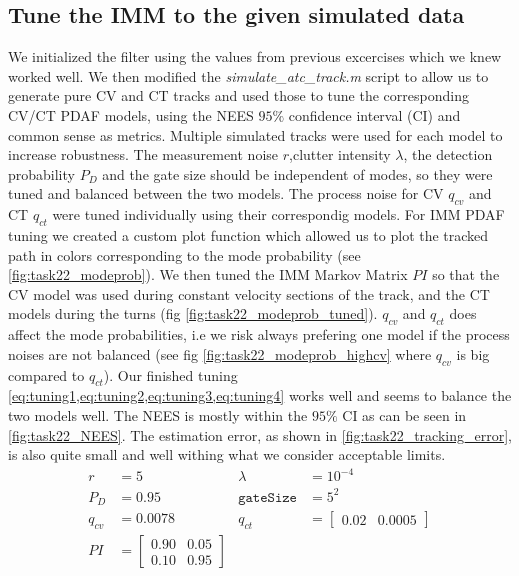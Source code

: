 \subsection{Tune the IMM to the given simulated data}

We initialized the filter using the values from previous excercises which we knew worked well. We then modified the \textit{simulate\_atc\_track.m} script to allow us to generate pure CV and CT tracks and used those to tune the corresponding CV/CT PDAF models, using the NEES $95 \%$ confidence interval (CI) and common sense as metrics. Multiple simulated tracks were used for each model to increase robustness. The measurement noise $r$,clutter intensity $\lambda$, the detection probability $P_D$ and the gate size should be independent of modes, so they were tuned and balanced between the two models. The process noise for CV $q_{cv}$ and CT $q_{ct}$ were tuned individually using their correspondig models. For IMM PDAF tuning we created a custom plot function which allowed us to plot the tracked path in colors corresponding to the mode probability (see \cref{fig:task22_modeprob}). We then tuned the IMM Markov Matrix $PI$ so that the CV model was used during constant velocity sections of the track, and the CT models during the turns (fig \ref{fig:task22_modeprob_tuned}). $q_{cv}$ and $q_{ct}$ does affect the mode probabilities, i.e we risk always prefering one model if the process noises are not balanced (see fig \ref{fig:task22_modeprob_highcv} where $q_{cv}$ is big compared to $q_{ct}$). Our finished tuning \cref{eq:tuning1,eq:tuning2,eq:tuning3,eq:tuning4} works well and seems to balance the two models well. The NEES is mostly within the $95\%$ CI as can be seen in \cref{fig:task22_NEES}. The estimation error, as shown in \cref{fig:task22_tracking_error}, is also quite small and well withing what we consider acceptable limits.
\begin{align}
        r &= 5 & \lambda &= 10^{-4} \label{eq:tuning1} \\ 
        P_D &= 0.95 & \texttt{gateSize} &= 5^2 \label{eq:tuning2} \\
        q_{cv} &= 0.0078  & q_{ct} &= \begin{bmatrix}0.02 & 0.0005\end{bmatrix} \label{eq:tuning3} \\
        PI &= \begin{bmatrix}0.90 & 0.05 \\ 0.10 & 0.95\end{bmatrix} \label{eq:tuning4}
\end{align}

